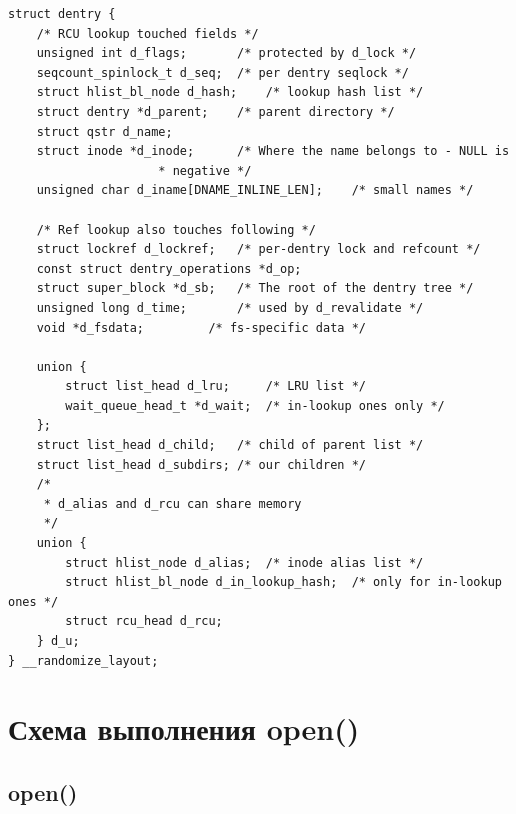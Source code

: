 \begin{lstlisting}
struct dentry {
	/* RCU lookup touched fields */
	unsigned int d_flags;		/* protected by d_lock */
	seqcount_spinlock_t d_seq;	/* per dentry seqlock */
	struct hlist_bl_node d_hash;	/* lookup hash list */
	struct dentry *d_parent;	/* parent directory */
	struct qstr d_name;
	struct inode *d_inode;		/* Where the name belongs to - NULL is
					 * negative */
	unsigned char d_iname[DNAME_INLINE_LEN];	/* small names */

	/* Ref lookup also touches following */
	struct lockref d_lockref;	/* per-dentry lock and refcount */
	const struct dentry_operations *d_op;
	struct super_block *d_sb;	/* The root of the dentry tree */
	unsigned long d_time;		/* used by d_revalidate */
	void *d_fsdata;			/* fs-specific data */

	union {
		struct list_head d_lru;		/* LRU list */
		wait_queue_head_t *d_wait;	/* in-lookup ones only */
	};
	struct list_head d_child;	/* child of parent list */
	struct list_head d_subdirs;	/* our children */
	/*
	 * d_alias and d_rcu can share memory
	 */
	union {
		struct hlist_node d_alias;	/* inode alias list */
		struct hlist_bl_node d_in_lookup_hash;	/* only for in-lookup ones */
	 	struct rcu_head d_rcu;
	} d_u;
} __randomize_layout;
\end{lstlisting}



\chapter{Схема выполнения open()}

\section{open()}

